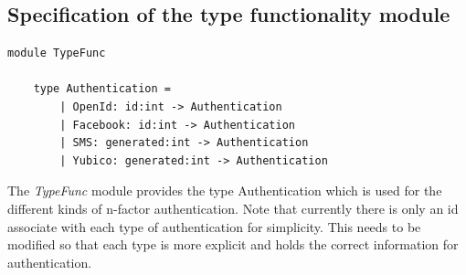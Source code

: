 \documentclass[twosided]{report}
\begin{document}
\subsection{Specification of the type functionality module}
\begin{lstlisting}[style=fstar, caption={TypeFunc module}]
	module TypeFunc

	type Authentication =
		| OpenId: id:int -> Authentication
		| Facebook: id:int -> Authentication
		| SMS: generated:int -> Authentication
		| Yubico: generated:int -> Authentication
\end{lstlisting}

The \emph{TypeFunc} module provides the type Authentication which is used for the different kinds of n-factor authentication. Note that currently there is only an id associate with each type of authentication for simplicity. This needs to be modified so that each type is more explicit and holds the correct information for authentication.
\end{document}

